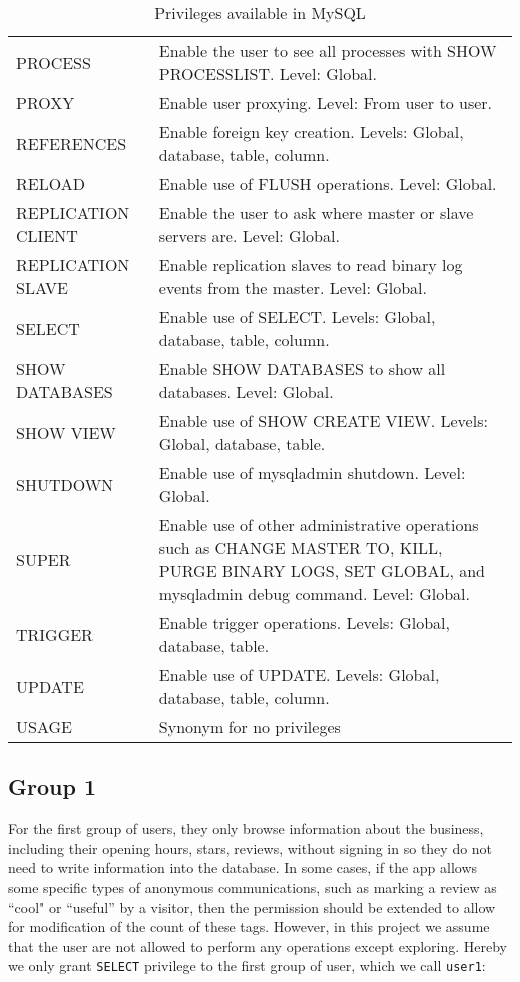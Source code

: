 \documentclass[12pt]{scrbook}
\begin{document}
\begin{table}
\begin{tabular}{l|p{5.5in}}
      PROCESS & Enable the user to see all processes with SHOW PROCESSLIST. Level: Global. \\
      PROXY & Enable user proxying. Level: From user to user. \\
      REFERENCES & Enable foreign key creation. Levels: Global, database, table, column. \\
      RELOAD & Enable use of FLUSH operations. Level: Global. \\
      REPLICATION CLIENT & Enable the user to ask where master or slave servers are. Level: Global. \\
      REPLICATION SLAVE & Enable replication slaves to read binary log events from the master. Level: Global. \\
      SELECT & Enable use of SELECT. Levels: Global, database, table, column. \\
      SHOW DATABASES & Enable SHOW DATABASES to show all databases. Level: Global. \\
      SHOW VIEW & Enable use of SHOW CREATE VIEW. Levels: Global, database, table. \\
      SHUTDOWN & Enable use of mysqladmin shutdown. Level: Global. \\
      SUPER & Enable use of other administrative operations such as CHANGE MASTER TO, KILL, PURGE BINARY LOGS, SET GLOBAL, and mysqladmin debug command. Level: Global. \\
      TRIGGER & Enable trigger operations. Levels: Global, database, table. \\
      UPDATE & Enable use of UPDATE. Levels: Global, database, table, column. \\
      USAGE & Synonym for  no privileges  \\
      \hline
      \end{tabular}%
    \caption{Privileges available in MySQL}
    \label{tab:privileges}%
  \end{table}%

\subsection{Group 1}
    For the first group of users, they only browse information about the business, including their
	opening hours, stars, reviews, without signing in so they do not need to write information into
	the database. In some cases, if the app allows some specific types of anonymous communications,
	such as marking a review as ``cool" or ``useful'' by a visitor, then the permission should be
	extended to allow for modification of the count of these tags. However, in this project we
	assume that the user are not allowed to perform any operations except exploring. Hereby we only
	grant \texttt{SELECT} privilege to the first group of user, which we call \texttt{user1}:
\end{document}
